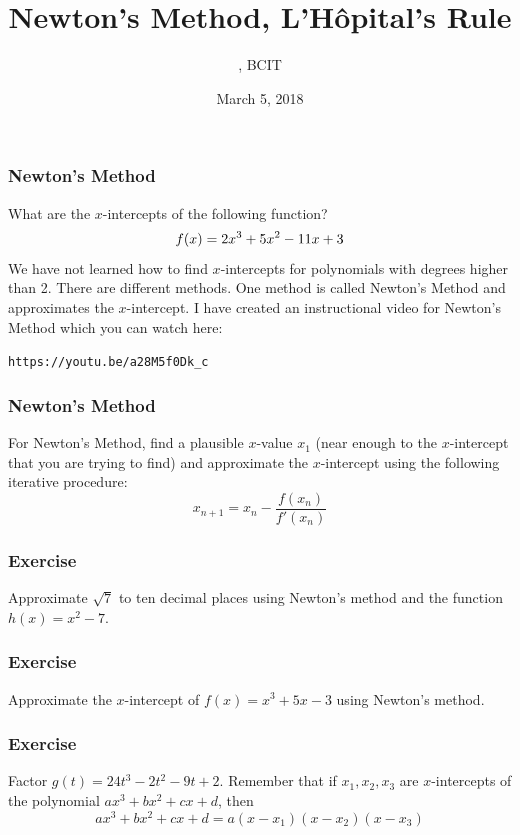 \documentclass[xcolor=dvipsnames]{beamer}
\title{Newton's Method, L'H{\^o}pital's Rule}
\subtitle{{\CourseNumber}, BCIT}
\author{\CourseName}
\date{March 5, 2018}
\begin{document}
\begin{frame}
  \titlepage
\end{frame}


\begin{frame}
  \frametitle{Newton's Method}
What are the $x$-intercepts of the following function?
\begin{equation}
  \label{eq:ietaicie}
f(x)=2x^{3}+5x^{2}-11x+3\notag
\end{equation}
We have not learned how to find $x$-intercepts for polynomials with
degrees higher than 2. There are different methods. One method is
called \alert{Newton's Method} and approximates the $x$-intercept. I
have created an instructional video for Newton's Method which you can
watch here:
\begin{alltt}
https://youtu.be/a28M5f0Dk\_c
\end{alltt}
\end{frame}

\begin{frame}
  \frametitle{Newton's Method}
For Newton's Method, find a plausible $x$-value $x_{1}$ (near enough
to the $x$-intercept that you are trying to find) and approximate the
$x$-intercept using the following iterative procedure:
\begin{equation}
  \label{eq:heimioje}
  x_{n+1}=x_{n}-\frac{f(x_{n})}{f'(x_{n})}
\end{equation}
\end{frame}

\begin{frame}
  \frametitle{Exercise}
{\ubung} Approximate $\sqrt{7}$ to ten decimal places using Newton's
  method and the function $h(x)=x^{2}-7$. 
\end{frame}

\begin{frame}
  \frametitle{Exercise}
{\ubung} Approximate the $x$-intercept of $f(x)=x^{3}+5x-3$ using
  Newton's method. %
\end{frame}

\begin{frame}
  \frametitle{Exercise}
{\ubung} Factor $g(t)=24t^{3}-2t^{2}-9t+2$. Remember that if $x_{1},x_{2},x_{3}$ 
  are $x$-intercepts of the polynomial $ax^{3}+bx^{2}+cx+d$, then
  \begin{equation}
    \label{eq:ahsuagha}
    ax^{3}+bx^{2}+cx+d=a(x-x_{1})(x-x_{2})(x-x_{3})
  \end{equation}
\end{frame}
\end{document}
